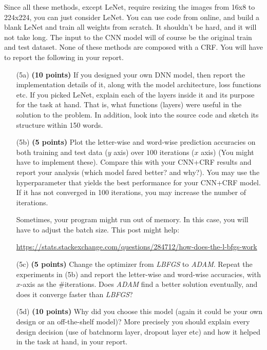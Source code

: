 \documentclass[11pt]{report}
\begin{document}
Since all these methods, except LeNet, require resizing the images from 16x8 to 224x224, you can just consider LeNet.
You can use code from online, and build a blank LeNet and train all weights from scratch.  It shouldn't be hard, and it will not take long.
The input to the CNN model will of course be the original train and test
dataset. None of these methods are composed with a CRF.
You will have to report the following in your report.
%
\begin{itemize}
\item[(5a)] \textbf{(10 points)} If you designed your own DNN model, then report
  the implementation details of it, along with the model architecture, loss
  functions etc. If you picked LeNet, explain each of the
  layers inside it and its purpose for the task at hand. 
  That is, what functions (layers) were useful in the solution to the
  problem. In addition, look into the source code and sketch its structure
  within 150 words.

	
\item[(5b)] \textbf{(5 points)} Plot the letter-wise and word-wise prediction
  accuracies on both training and test data (\(y\) axis) over \(100\) iterations
  (\(x\) axis) (You might have to implement these). Compare this with your CNN+CRF
  results and report your analysis (which model fared better? and why?). You may
  use the hyperparameter that yields the best performance for your CNN+CRF
  model.
  If it has not converged in 100 iterations, you may increase the number of iterations.
  
  Sometimes, your program might run out of memory. In this case, you will have to adjust the batch size.  This post might help:
  
  \url{https://stats.stackexchange.com/questions/284712/how-does-the-l-bfgs-work}
  
  
  
\item[(5c)] {\bf (5 points)} Change the optimizer from {\em LBFGS} to {\em
    ADAM}. Repeat the experiments in (5b) and report the letter-wise and
  word-wise accuracies, with \(x\)-axis as the \#iterations. Does {\em ADAM} find
  a better solution eventually, and does it converge faster than {\em LBFGS}?


\item[(5d)] \textbf{(10 points)} Why did you choose this model (again it could
  be your own design or an off-the-shelf model)? More precisely you should
  explain every design decision (use of batchnorm layer, dropout layer etc) and
  how it helped in the task at hand, in your report.
\end{itemize}


 
\label{sec:appdxconvfilters}
\end{document}
